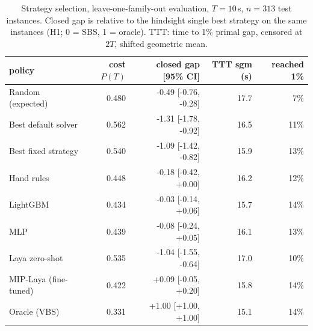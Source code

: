 \begin{table}[t]\centering\small
\begin{tabular}{lrrrr}
\toprule
policy & cost $P(T)$ & closed gap [95\% CI] & TTT sgm (s) & reached 1\% \\
\midrule
Random (expected) & 0.480 & -0.49 [-0.76, -0.28] & 17.7 & 7\% \\
Best default solver & 0.562 & -1.31 [-1.78, -0.92] & 16.5 & 11\% \\
Best fixed strategy & 0.540 & -1.09 [-1.42, -0.82] & 15.9 & 13\% \\
Hand rules & 0.448 & -0.18 [-0.42, +0.00] & 16.2 & 12\% \\
LightGBM & 0.434 & -0.03 [-0.14, +0.06] & 15.7 & 14\% \\
MLP & 0.439 & -0.08 [-0.24, +0.05] & 16.1 & 13\% \\
Laya zero-shot & 0.535 & -1.04 [-1.55, -0.64] & 17.0 & 10\% \\
MIP-Laya (fine-tuned) & 0.422 & +0.09 [-0.05, +0.20] & 15.8 & 14\% \\
Oracle (VBS) & 0.331 & +1.00 [+1.00, +1.00] & 15.1 & 14\% \\
\bottomrule
\end{tabular}
\caption{Strategy selection, leave-one-family-out evaluation, $T=10$\,s, $n=313$ test instances. Closed gap is relative to the hindsight single best strategy on the same instances (H1; 0 = SBS, 1 = oracle). TTT: time to 1\% primal gap, censored at $2T$, shifted geometric mean.}\label{tab:sel-lofo-10}
\end{table}